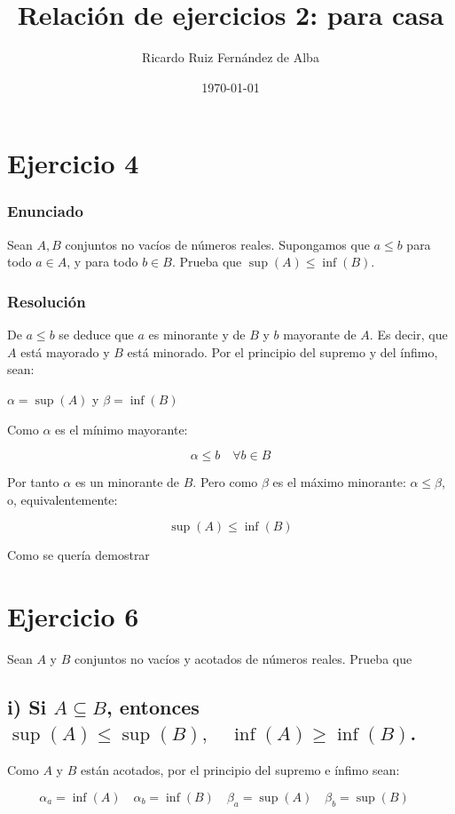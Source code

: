 \documentclass[11pt]{article}
\author{Ricardo Ruiz Fernández de Alba}
\date{\today}
\title{Relación de ejercicios 2: para casa}
\begin{document}
\maketitle
\tableofcontents


\section{Ejercicio 4}
\label{sec-1}
\subsubsection{Enunciado}
\label{sec-1-0-1}
Sean $A,B$ conjuntos no vacíos de números reales. Supongamos que $a \leq b$
para todo $a \in A$, y para todo $b \in B$.  Prueba que $\sup(A) \leq \inf(B)$.

\subsubsection{Resolución}
\label{sec-1-0-2}

De $a\leq b$ se deduce que $a$ es minorante y de $B$ y $b$ mayorante de $A$.
Es decir, que $A$ está mayorado y $B$ está minorado. Por el principio del supremo
y del ínfimo, sean:

$\alpha = \sup(A)$ y $\beta =
\inf(B)$

Como $\alpha$ es el mínimo mayorante:

\[\alpha \leq b \quad \forall b \in B\]

Por tanto $\alpha$ es un minorante de $B$. Pero como $\beta$ es el máximo
minorante: $\alpha \leq \beta$, o, equivalentemente:

\[
\sup(A) \leq \inf(B)
\]

Como se quería demostrar

\section{Ejercicio 6}
\label{sec-2}
Sean $A$ y $B$ conjuntos no vacíos y acotados de números reales. Prueba que

\subsection{i) Si $A \subseteq B$, entonces $\sup(A) \leq \sup(B), \quad \inf(A) \geq \inf(B)$.}
\label{sec-2-1}

Como $A$ y $B$ están acotados, por el principio del supremo
e ínfimo sean:

\[
\alpha_a = \inf(A) \quad
\alpha_b = \inf(B) \quad
\beta_a = \sup(A) \quad
\beta_b = \sup(B) \quad
\]
\end{document}
